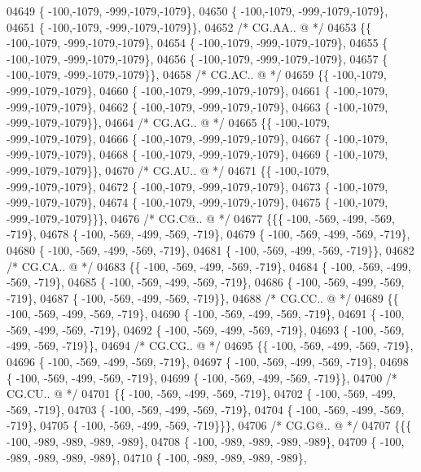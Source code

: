 \begin{DoxyCode}
04649 \{ -100,-1079, -999,-1079,-1079\},
04650 \{ -100,-1079, -999,-1079,-1079\},
04651 \{ -100,-1079, -999,-1079,-1079\}\},
04652 \textcolor{comment}{/* CG.AA.. @ */}
04653 \{\{ -100,-1079, -999,-1079,-1079\},
04654 \{ -100,-1079, -999,-1079,-1079\},
04655 \{ -100,-1079, -999,-1079,-1079\},
04656 \{ -100,-1079, -999,-1079,-1079\},
04657 \{ -100,-1079, -999,-1079,-1079\}\},
04658 \textcolor{comment}{/* CG.AC.. @ */}
04659 \{\{ -100,-1079, -999,-1079,-1079\},
04660 \{ -100,-1079, -999,-1079,-1079\},
04661 \{ -100,-1079, -999,-1079,-1079\},
04662 \{ -100,-1079, -999,-1079,-1079\},
04663 \{ -100,-1079, -999,-1079,-1079\}\},
04664 \textcolor{comment}{/* CG.AG.. @ */}
04665 \{\{ -100,-1079, -999,-1079,-1079\},
04666 \{ -100,-1079, -999,-1079,-1079\},
04667 \{ -100,-1079, -999,-1079,-1079\},
04668 \{ -100,-1079, -999,-1079,-1079\},
04669 \{ -100,-1079, -999,-1079,-1079\}\},
04670 \textcolor{comment}{/* CG.AU.. @ */}
04671 \{\{ -100,-1079, -999,-1079,-1079\},
04672 \{ -100,-1079, -999,-1079,-1079\},
04673 \{ -100,-1079, -999,-1079,-1079\},
04674 \{ -100,-1079, -999,-1079,-1079\},
04675 \{ -100,-1079, -999,-1079,-1079\}\}\},
04676 \textcolor{comment}{/* CG.C@.. @ */}
04677 \{\{\{ -100, -569, -499, -569, -719\},
04678 \{ -100, -569, -499, -569, -719\},
04679 \{ -100, -569, -499, -569, -719\},
04680 \{ -100, -569, -499, -569, -719\},
04681 \{ -100, -569, -499, -569, -719\}\},
04682 \textcolor{comment}{/* CG.CA.. @ */}
04683 \{\{ -100, -569, -499, -569, -719\},
04684 \{ -100, -569, -499, -569, -719\},
04685 \{ -100, -569, -499, -569, -719\},
04686 \{ -100, -569, -499, -569, -719\},
04687 \{ -100, -569, -499, -569, -719\}\},
04688 \textcolor{comment}{/* CG.CC.. @ */}
04689 \{\{ -100, -569, -499, -569, -719\},
04690 \{ -100, -569, -499, -569, -719\},
04691 \{ -100, -569, -499, -569, -719\},
04692 \{ -100, -569, -499, -569, -719\},
04693 \{ -100, -569, -499, -569, -719\}\},
04694 \textcolor{comment}{/* CG.CG.. @ */}
04695 \{\{ -100, -569, -499, -569, -719\},
04696 \{ -100, -569, -499, -569, -719\},
04697 \{ -100, -569, -499, -569, -719\},
04698 \{ -100, -569, -499, -569, -719\},
04699 \{ -100, -569, -499, -569, -719\}\},
04700 \textcolor{comment}{/* CG.CU.. @ */}
04701 \{\{ -100, -569, -499, -569, -719\},
04702 \{ -100, -569, -499, -569, -719\},
04703 \{ -100, -569, -499, -569, -719\},
04704 \{ -100, -569, -499, -569, -719\},
04705 \{ -100, -569, -499, -569, -719\}\}\},
04706 \textcolor{comment}{/* CG.G@.. @ */}
04707 \{\{\{ -100, -989, -989, -989, -989\},
04708 \{ -100, -989, -989, -989, -989\},
04709 \{ -100, -989, -989, -989, -989\},
04710 \{ -100, -989, -989, -989, -989\},

\end{DoxyCode}
